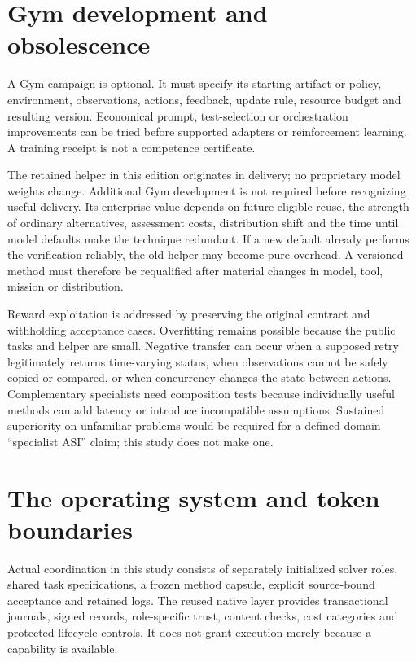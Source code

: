 \documentclass[11pt,letterpaper]{article}
\begin{document}
\section{Gym development and obsolescence}
A Gym campaign is optional. It must specify its starting artifact or policy, environment, observations, actions, feedback, update rule, resource budget and resulting version. Economical prompt, test-selection or orchestration improvements can be tried before supported adapters or reinforcement learning. A training receipt is not a competence certificate.

The retained helper in this edition originates in delivery; no proprietary model weights change. Additional Gym development is not required before recognizing useful delivery. Its enterprise value depends on future eligible reuse, the strength of ordinary alternatives, assessment costs, distribution shift and the time until model defaults make the technique redundant. If a new default already performs the verification reliably, the old helper may become pure overhead. A versioned method must therefore be requalified after material changes in model, tool, mission or distribution.

Reward exploitation is addressed by preserving the original contract and withholding acceptance cases. Overfitting remains possible because the public tasks and helper are small. Negative transfer can occur when a supposed retry legitimately returns time-varying status, when observations cannot be safely copied or compared, or when concurrency changes the state between actions. Complementary specialists need composition tests because individually useful methods can add latency or introduce incompatible assumptions. Sustained superiority on unfamiliar problems would be required for a defined-domain ``specialist ASI'' claim; this study does not make one.

\section{The operating system and token boundaries}
Actual coordination in this study consists of separately initialized solver roles, shared task specifications, a frozen method capsule, explicit source-bound acceptance and retained logs. The reused native layer provides transactional journals, signed records, role-specific trust, content checks, cost categories and protected lifecycle controls. It does not grant execution merely because a capability is available.
\end{document}
